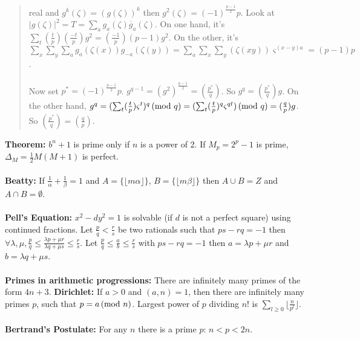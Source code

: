 \begin{quote}
real
and $g^k(\zeta)= (g(\zeta))^k$ then $g^2(\zeta)= (-1)^{\frac {p-1} 2} p$.
Look at $|g(\zeta)|^2 = T = \sum_a
g_a (\zeta) {\overline g_a (\zeta)}$.  On one hand,
it's
$\sum_t ({\frac t p}) ({\frac {-t} p}) g^2 = ({\frac {-1} p}) (p-1) g^2$.
On the other, it's
$\sum_x \sum_y \sum_a g_a(\zeta(x)) g_{-a}(\zeta(y))=
\sum_a \sum_x \sum_y (\zeta(xy)) \varsigma^{(x-y)a} =(p-1)p$.
\\
\\
Now set $p^*= (-1)^{\frac {p-1} 2} p$.
$g^{q-1}= (g^2)^{\frac {q-1} 2}= ({\frac {p^*} q})$.
So $g^q= ({\frac {p^*} q}) g$.  On the other hand,
$g^q
= (\sum_t ({\frac t p}) \varsigma^{t})^q \thinspace \textnormal{(mod } q \textnormal{)}=
(\sum_t ({\frac t p})^q \varsigma^{qt}) \thinspace \textnormal{(mod } q \textnormal{)} =
({\frac q p}) g$.  So $({\frac {p^*} q}) = ({\frac q p})$.
\end{quote}
{\bf Theorem:}
$b^{n}+1$ is prime only if $n$ is a power of 2.
If $M_{p}= 2^{p}-1$ is prime, $\Delta_{M} = \frac {1}{2} M (M+1)$ is
perfect.
\\
\\
{\bf Beatty:} If ${\frac {1} {\alpha}} + {\frac {1} {\beta}} = 1$ and
$A= \{ \lfloor m \alpha \rfloor \}$,
$B= \{ \lfloor m \beta \rfloor \}$ then $A \cup B = Z$ and $A \cap B =
\emptyset$.
\\
\\
{\bf Pell's Equation:} $x^2 -d y^2 = 1$ is solvable
(if $d$ is not a perfect square) using
continued fractions.
Let ${\frac p q}<{\frac r s}$ be two rationals such that $ps-rq = -1$
then $\forall \lambda, \mu, {\frac p q} \leq
{\frac {\lambda p + \mu r} {\lambda q + \mu s}}
\leq {\frac r s}$.
Let ${\frac p q} \leq {\frac a b} \leq {\frac r s}$
with $ps-rq = -1$
then $a= {\lambda p + \mu r}$ and
$b= {\lambda q + \mu s}$.
\\
\\
{\bf Primes in arithmetic progressions:} There are infinitely many primes of the form $4n+3$.
{\bf Dirichlet:}  If $a>0$ and $(a,n)=1$, then there are infinitely many primes
$p$, such that $p = a \thinspace \textnormal{(mod } n \textnormal{)}$.
Largest power of $p$ dividing $n!$ is
$\sum_{l \geq 0} \lfloor {\frac {n} {p^l}} \rfloor$.
\\
\\
{\bf Bertrand's Postulate:} For any $n$ there is a prime $p$: $n < p < 2n$.
